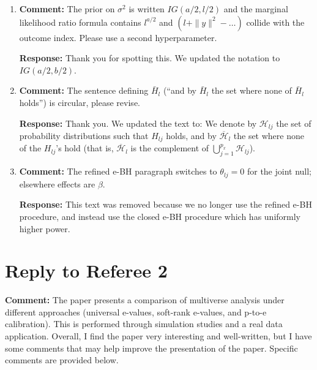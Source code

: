 \documentclass[11pt, a4paper]{article}
\newcommand{\reply}{\vspace{0.3cm} \noindent \textbf{Response:} {\it }}
\begin{document}
\begin{enumerate}
    \item \textbf{Comment:} The prior on $\sigma^2$ is written $IG(a/2, l/2)$ and the marginal likelihood ratio formula contains $l^{a/2}$ and $(l + \|y\|^2 - \dots)$ collide with the outcome index. Please use a second hyperparameter.
    
    \reply Thank you for spotting this. We updated the notation to $IG(a/2, b/2)$.

    \vspace{0.5cm}

    \item \textbf{Comment:} The sentence defining $\bar{H}_l$ (``and by $\bar{H}_l$ the set where none of $\bar{H}_l$ holds'') is circular, please revise.
    
    \reply Thank you. We updated the text to: We denote by $\mathcal{H}_{lj}$ the set of probability distributions such that $H_{lj}$ holds, and by $\overline{\mathcal{H}}_l$ the set where \color{blue} none of the $H_{lj}$'s hold (that is, $\overline{\mathcal{H}}_l$ is the complement of $\bigcup_{j=1}^{p_x} \mathcal{H}_{lj}$). \color{black}


    \vspace{0.5cm}

    \item \textbf{Comment:} The refined e-BH paragraph switches to $\theta_{lj} = 0$ for the joint null; elsewhere effects are $\beta$.
    
    \reply This text was removed because we no longer use the refined e-BH procedure, and instead use the closed e-BH procedure which has uniformly higher power.

    \vspace{0.5cm}
\end{enumerate}



\section*{Reply to Referee 2}

\textbf{Comment:} The paper presents a comparison of multiverse analysis under different approaches (universal e-values, soft-rank e-values, and p-to-e calibration). This is performed through simulation studies and a real data application. Overall, I find the paper very interesting and well-written, but I have some comments that may help improve the presentation of the paper. Specific
comments are provided below.
\end{document}
